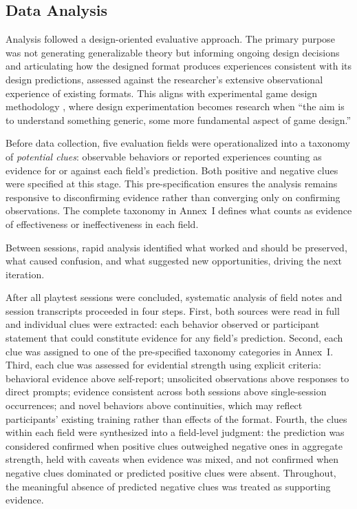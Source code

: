 \subsection{Data Analysis}

Analysis followed a design-oriented evaluative approach. The primary purpose was not generating generalizable theory but informing ongoing design decisions and articulating how the designed format produces experiences consistent with its design predictions, assessed against the researcher's extensive observational experience of existing formats. This aligns with experimental game design methodology \parencite{waern2015experimental}, where design experimentation becomes research when ``the aim is to understand something generic, some more fundamental aspect of game design.''

Before data collection, five evaluation fields were operationalized into a taxonomy of \textit{potential clues}: observable behaviors or reported experiences counting as evidence for or against each field's prediction. Both positive and negative clues were specified at this stage. This pre-specification ensures the analysis remains responsive to disconfirming evidence rather than converging only on confirming observations. The complete taxonomy in Annex~I defines what counts as evidence of effectiveness or ineffectiveness in each field.

Between sessions, rapid analysis identified what worked and should be preserved, what caused confusion, and what suggested new opportunities, driving the next iteration.

After all playtest sessions were concluded, systematic analysis of field notes and session transcripts proceeded in four steps. First, both sources were read in full and individual clues were extracted: each behavior observed or participant statement that could constitute evidence for any field's prediction. Second, each clue was assigned to one of the pre-specified taxonomy categories in Annex~I. Third, each clue was assessed for evidential strength using explicit criteria: behavioral evidence above self-report; unsolicited observations above responses to direct prompts; evidence consistent across both sessions above single-session occurrences; and novel behaviors above continuities, which may reflect participants' existing training rather than effects of the format. Fourth, the clues within each field were synthesized into a field-level judgment: the prediction was considered confirmed when positive clues outweighed negative ones in aggregate strength, held with caveats when evidence was mixed, and not confirmed when negative clues dominated or predicted positive clues were absent. Throughout, the meaningful absence of predicted negative clues was treated as supporting evidence.

